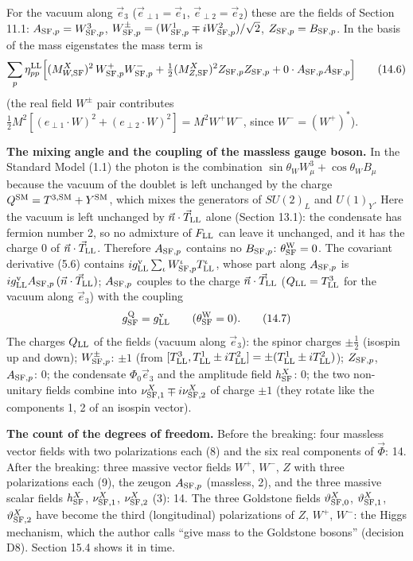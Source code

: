 \documentclass[
  10pt,
]{article}
\begin{document}
For the vacuum along \(\vec e_3\) (\(\vec e_{\perp1}=\vec e_1\),
\(\vec e_{\perp2}=\vec e_2\)) these are the fields of Section 11.1:
\(A_{{\rm SF},p}=W^3_{{\rm SF},p}\),
\(W^\pm_{{\rm SF},p}=(W^1_{{\rm SF},p}\mp iW^2_{{\rm SF},p})/\sqrt2\),
\(Z_{{\rm SF},p}=B_{{\rm SF},p}\). In the basis of the mass eigenstates
the mass term is
\[\sum_p\eta^{\rm LL}_{pp}\Big[(M^X_{W,{\rm SF}})^2\,W^+_{{\rm SF},p}W^-_{{\rm SF},p}+\tfrac12(M^X_{Z,{\rm SF}})^2Z_{{\rm SF},p}Z_{{\rm SF},p}+0\cdot A_{{\rm SF},p}A_{{\rm SF},p}\Big]\tag{14.6}\]
(the real field \(W^\pm\) pair contributes
\(\tfrac12M^2[(e_{\perp1}\cdot W)^2+(e_{\perp2}\cdot W)^2]=M^2W^+W^-\),
since \(W^-=(W^+)^*\)).

\textbf{The mixing angle and the coupling of the massless gauge boson.}
In the Standard Model (1.1) the photon is the combination
\(\sin\theta_WW^3_\mu+\cos\theta_WB_\mu\) because the vacuum of the
doublet is left unchanged by the charge
\(Q^{\rm SM}=T^{3,{\rm SM}}+Y^{\rm SM}\), which mixes the generators of
\(SU(2)_L\) and \(U(1)_Y\). Here the vacuum is left unchanged by
\(\vec n\cdot\vec T_{\rm LL}\) alone (Section 13.1): the condensate has
fermion number 2, so no admixture of \(F_{\rm LL}\) can leave it
unchanged, and it has the charge 0 of \(\vec n\cdot\vec T_{\rm LL}\).
Therefore \(A_{{\rm SF},p}\) contains no \(B_{{\rm SF},p}\):
\(\theta^{\rm W}_{\rm SF}=0\). The covariant derivative (5.6) contains
\(ig^{\rm v}_{\rm LL}\sum_\iota W^\iota_{{\rm SF},p}T^\iota_{\rm LL}\),
whose part along \(A_{{\rm SF},p}\) is
\(ig^{\rm v}_{\rm LL}A_{{\rm SF},p}\,(\vec n\cdot\vec T_{\rm LL})\);
\(A_{{\rm SF},p}\) couples to the charge \(\vec n\cdot\vec T_{\rm LL}\)
(\(Q_{\rm LL}=T^3_{\rm LL}\) for the vacuum along \(\vec e_3\)) with the
coupling
\[g^{\rm Q}_{\rm SF}=g^{\rm v}_{\rm LL}\qquad(\theta^{\rm W}_{\rm SF}=0).\tag{14.7}\]
The charges \(Q_{\rm LL}\) of the fields (vacuum along \(\vec e_3\)):
the spinor charges \(\pm\tfrac12\) (isospin up and down);
\(W^\pm_{{\rm SF},p}\): \(\pm1\) (from
\([T^3_{\rm LL},T^1_{\rm LL}\pm iT^2_{\rm LL}]=\pm(T^1_{\rm LL}\pm iT^2_{\rm LL})\));
\(Z_{{\rm SF},p}\), \(A_{{\rm SF},p}\): 0; the condensate
\(\Phi_0\vec e_3\) and the amplitude field \(h^X_{\rm SF}\): 0; the two
non-unitary fields combine into
\(\nu^X_{{\rm SF},1}\mp i\nu^X_{{\rm SF},2}\) of charge \(\pm1\) (they
rotate like the components 1, 2 of an isospin vector).

\textbf{The count of the degrees of freedom.} Before the breaking: four
massless vector fields with two polarizations each (8) and the six real
components of \(\vec\Phi\): 14. After the breaking: three massive vector
fields \(W^+\), \(W^-\), \(Z\) with three polarizations each (9), the
zeugon \(A_{{\rm SF},p}\) (massless, 2), and the three massive scalar
fields \(h^X_{\rm SF}\), \(\nu^X_{{\rm SF},1}\), \(\nu^X_{{\rm SF},2}\)
(3): 14. The three Goldstone fields \(\vartheta^X_{{\rm SF},0}\),
\(\vartheta^X_{{\rm SF},1}\), \(\vartheta^X_{{\rm SF},2}\) have become
the third (longitudinal) polarizations of \(Z\), \(W^+\), \(W^-\): the
Higgs mechanism, which the author calls ``give mass to the Goldstone
bosons'' (decision D8). Section 15.4 shows it in time.
\end{document}
